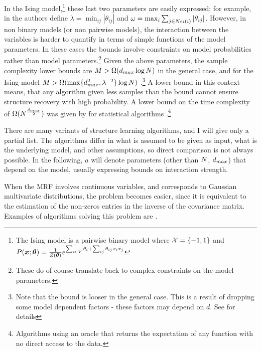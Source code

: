 In the Ising model,\footnote{The Ising model is a pairwise binary model where ${\cal X} = \{-1,1\}$ and $P(\boldsymbol{x};\boldsymbol{\theta}) = \frac{1}{Z(\boldsymbol{\theta})} e^{\sum_{i \in V}\theta_i + \sum_{ij}\theta_{ij}x_ix_j}$} these last two parameters are easily expressed; for example, in \cite{santhanam2012information} the authors define $\lambda =
\min_{ij} |\theta_{ij}|$ and $\omega = \max_i \sum_{j \in Nei(i)} |\theta_{ij}|$.
However, in non binary models (or non pairwise models), the interaction between the variables is harder to quantify in terms of simple functions of the model parameters.
In these cases the bounds involve constraints on model probabilities rather than model parameters.\footnote{These do of course translate back to complex constraints on the model parameters.}
Given the above parameters, the sample complexity lower bounds are $M > \Omega(d_{max} \log N)$ \cite{bresler2008reconstruction} in the general case, and for the Ising model $M > \Omega(\max\{d_{max}^2, \lambda^{-2}\}\log N)$ \cite{santhanam2012information}.\footnote{Note that the bound is looser in the general case. This is a result of dropping some model dependent factors - these factors may depend on $d$. See \cite{bresler2008reconstruction} for details}
A lower bound in this context means, that any algorithm given less samples than the bound cannot ensure structure recovery with high probability.
A lower bound on the time complexity of $\Omega(N^{\frac{d_{max}}{2}})$ was given by \cite{bresler2014structure} for statistical algorithms \cite{feldman2013statistical}.\footnote{Algorithms using an oracle that returns the expectation of any function with no direct access to the data.}

There are many variants of structure learning algorithms, and I will give only a partial list.
The algorithms differ in what is assumed to be given as input, what is the underlying model, and other assumptions, so direct comparison is not always possible.
In the following, $a$ will denote parameters (other than $N$, $d_{max}$) that depend on the model, usually expressing bounds on interaction strength.

When the MRF involves continuous variables, and corresponds to Gaussian multivariate distributions, the problem becomes easier, since it is equivalent to the estimation of the non-zeros entries in the inverse of the covariance matrix.
Examples of algorithms solving this problem are \cite{meinshausen2006high, yuan2007model, friedman2008sparse}. 

